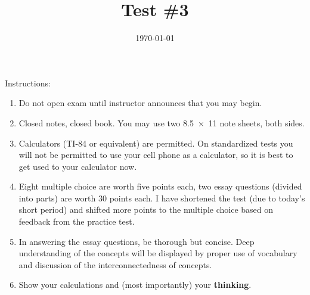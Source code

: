 \documentclass[exam,addpoints, noanswers]{exam}
\title{Test \#3}
\date{\today}
\author{\mobeardInstructorShort}
\begin{document}
\maketitle
\vfill
\mobeardExamNameBlock
\vfill
Instructions: 
\begin{enumerate}
\item Do not open exam until instructor announces that you may begin.
\item Closed notes, closed book.  You may use two \SI{8.5x11}{\inch} note sheets, both sides. 
\item Calculators (TI-84 or equivalent) are permitted.  On standardized tests you will not be permitted to use your cell phone as a calculator, so it is best to get used to your calculator now. 
\item Eight multiple choice are worth five points each, two essay questions (divided into parts) are worth 30 points each.  I have shortened the test (due to today's short period) and shifted more points to the multiple choice based on feedback from the practice test. 
\item In answering the essay questions, be thorough but concise. Deep understanding of the concepts will be displayed by proper use of vocabulary and discussion of the interconnectedness of concepts. 
\item Show your calculations and (most importantly) your \textbf{thinking}.
\end{enumerate}
\vfill
\begin{center}
\gradetable[h][questions]
\end{center}
\clearpage
\end{document}
